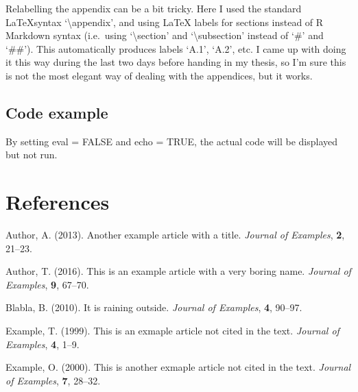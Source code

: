\documentclass[
  12pt,
]{article}
\newenvironment{Shaded}{\begin{snugshade}}{\end{snugshade}}
\newcommand{\ConstantTok}[1]{\textcolor[rgb]{0.00,0.00,0.00}{#1}}
\newcommand{\NormalTok}[1]{#1}
\newcommand{\OtherTok}[1]{\textcolor[rgb]{0.56,0.35,0.01}{#1}}
\newlength{\cslhangindent}
\newlength{\cslentryspacingunit} %
\newenvironment{CSLReferences}[2] %
 {%
  \setlength{\parindent}{0pt}
  \ifodd #1
  \let\oldpar\par
  \def\par{\hangindent=\cslhangindent\oldpar}
  \fi
  \setlength{\parskip}{#2\cslentryspacingunit}
 }%
 {}
\begin{document}
Relabelling the appendix can be a bit tricky. Here I used the standard
\LaTeX syntax `\textbackslash appendix', and using LaTeX labels for
sections instead of R Markdown syntax (i.e.~using
`\textbackslash section' and `\textbackslash subsection' instead of `\#'
and `\#\#'). This automatically produces labels `A.1', `A.2', etc. I
came up with doing it this way during the last two days before handing
in my thesis, so I'm sure this is not the most elegant way of dealing
with the appendices, but it works.

\subsection{Code example}

\begin{Shaded}
\begin{Highlighting}[]
\NormalTok{By setting eval }\OtherTok{=} \ConstantTok{FALSE}\NormalTok{ and echo }\OtherTok{=} \ConstantTok{TRUE}\NormalTok{, }
\NormalTok{the actual code will be displayed but not run.}
\end{Highlighting}
\end{Shaded}

\FloatBarrier
\newpage
{}

\hypertarget{references}{%
\section*{References}\label{references}}

\hypertarget{refs}{}
\begin{CSLReferences}{1}{0}
\leavevmode{}%
Author, A. (2013). Another example article with a title. \emph{Journal
of Examples}, \textbf{2}, 21--23.

\leavevmode{}%
Author, T. (2016). This is an example article with a very boring name.
\emph{Journal of Examples}, \textbf{9}, 67--70.

\leavevmode{}%
Blabla, B. (2010). It is raining outside. \emph{Journal of Examples},
\textbf{4}, 90--97.

\leavevmode{}%
Example, T. (1999). This is an exmaple article not cited in the text.
\emph{Journal of Examples}, \textbf{4}, 1--9.

\leavevmode{}%
Example, O. (2000). This is another exmaple article not cited in the
text. \emph{Journal of Examples}, \textbf{7}, 28--32.

\end{CSLReferences}
\end{document}
